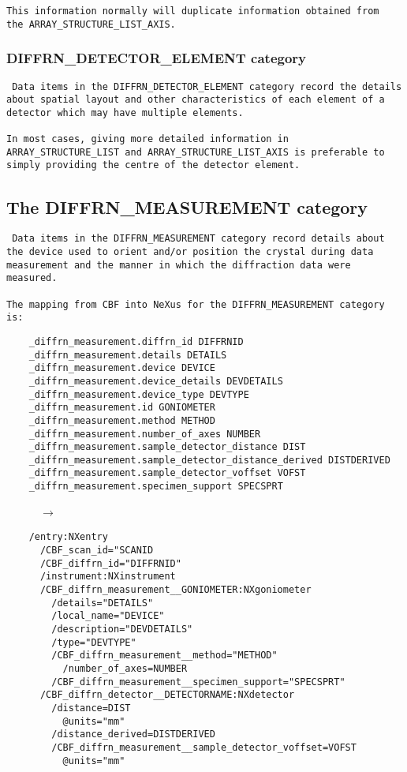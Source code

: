 \documentclass[11pt]{article}
\begin{document}
{\begin{verbatim}
This information normally will duplicate information obtained from
the ARRAY_STRUCTURE_LIST_AXIS.
\end{verbatim}  


\subsubsection{DIFFRN\_DETECTOR\_ELEMENT category}

\footnotesize \tt
Data items in the DIFFRN\_DETECTOR\_ELEMENT category record
the details about spatial layout and other characteristics
of each element of a detector which may have multiple elements.\\
~~\\
In most cases, giving more detailed information
in ARRAY\_STRUCTURE\_LIST and ARRAY\_STRUCTURE\_LIST\_AXIS
is preferable to simply providing the centre of the
 detector element.


\subsection{The DIFFRN\_MEASUREMENT category}

{\footnotesize \tt
Data items in the DIFFRN\_MEASUREMENT category record details
about the device used to orient and/or position the crystal
during data measurement and the manner in which the
diffraction data were measured.\\
~~\\
The mapping from CBF into NeXus for the DIFFRN\_MEASUREMENT category is:

\begin{verbatim}     
    _diffrn_measurement.diffrn_id DIFFRNID
    _diffrn_measurement.details DETAILS
    _diffrn_measurement.device DEVICE
    _diffrn_measurement.device_details DEVDETAILS
    _diffrn_measurement.device_type DEVTYPE
    _diffrn_measurement.id GONIOMETER
    _diffrn_measurement.method METHOD
    _diffrn_measurement.number_of_axes NUMBER
    _diffrn_measurement.sample_detector_distance DIST
    _diffrn_measurement.sample_detector_distance_derived DISTDERIVED
    _diffrn_measurement.sample_detector_voffset VOFST
    _diffrn_measurement.specimen_support SPECSPRT
\end{verbatim}
~~~~~~{\bf{}$\rightarrow$}\\
\begin{verbatim}
    /entry:NXentry
      /CBF_scan_id="SCANID
      /CBF_diffrn_id="DIFFRNID"
      /instrument:NXinstrument
      /CBF_diffrn_measurement__GONIOMETER:NXgoniometer
        /details="DETAILS"
        /local_name="DEVICE"       
        /description="DEVDETAILS"  
        /type="DEVTYPE"            
        /CBF_diffrn_measurement__method="METHOD"
          /number_of_axes=NUMBER
        /CBF_diffrn_measurement__specimen_support="SPECSPRT"
      /CBF_diffrn_detector__DETECTORNAME:NXdetector
        /distance=DIST
          @units="mm"
        /distance_derived=DISTDERIVED
        /CBF_diffrn_measurement__sample_detector_voffset=VOFST
          @units="mm"
\end{verbatim}


}}
\end{document}
